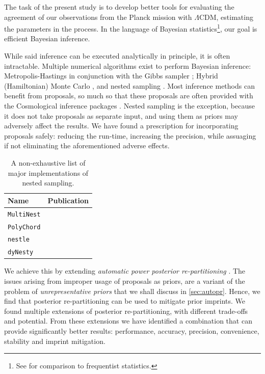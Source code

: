 \documentclass[usenatbib]{mnras}
\begin{document}
The task of the present study is to develop better tools for
evaluating the agreement of our observations from the Planck mission
with \(\Lambda\)CDM, estimating the parameters in the process. In the
language of Bayesian statistics\footnote{See \cite{xkcd} for
  comparison to frequentist statistics.}, our goal is efficient
Bayesian inference. 

While said inference can be executed analytically in principle, it is
often intractable. Multiple numerical algorithms exist to perform
Bayesian inference: Metropolis-Hastings \citep{Metropolis} in
conjunction with the Gibbs sampler \citep{Metropolis-Hastings-Gibbs};
Hybrid (Hamiltonian) Monte Carlo \citep{1701.02434,Duane_1987}, and
nested sampling \citep{Skilling2006}. Most inference methods can
benefit from proposals, so much so that these proposals are often
provided with the Cosmological inference packages
\citep{cobaya}. Nested sampling is the exception, because it does not
take proposals as separate input, and using them as priors may
adversely affect the results. We have found a prescription for
incorporating proposals safely: reducing the run-time, increasing the
precision, while assuaging if not eliminating the aforementioned
adverse effects.

\begin{table}
  \centering
  \caption{A non-exhaustive list of major implementations of nested sampling.}
  \begin{tabular}{lr}
    \textbf{Name} & \textbf{Publication}\\
    \hline
    \texttt{MultiNest} & \cite{Feroz2009MultiNestAE} \\
    \texttt{PolyChord} & \cite{polychord} \\
    \texttt{nestle} & \cite{nestle} \\
    \texttt{dyNesty} & \cite{Speagle_2020}
  \end{tabular}

\end{table}

We achieve this by extending \emph{automatic power posterior
  re-partitioning} \citep{chen-ferroz-hobson}. The issues arising from
improper usage of proposals as priors, are a variant of the problem of
\emph{unrepresentative priors} that we shall discuss in
\cref{sec:autopr}. Hence, we find that posterior re-partitioning can
be used to mitigate prior imprints. We found multiple extensions of
posterior re-partitioning, with different trade-offs and potential.
From these extensions we have identified a combination that can
provide significantly better results: performance, accuracy,
precision, convenience, stability and imprint mitigation.
\end{document}

